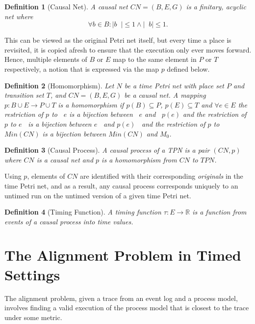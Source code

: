 \documentclass[conference]{IEEEtran}
\DeclareMathOperator*{\pre}{^\bullet}
\newtheorem{definition}{Definition}
\begin{document}
	\begin{definition}[Causal Net] \label{cn}
		A \textit{causal net} $CN = (B, E, G)$ is a finitary, acyclic net where 
		$$\forall b \in B : |b \pre| \leq 1 \wedge | \pre b| \leq 1.$$
	\end{definition}
	
	This can be viewed as the original Petri net itself, but every time a place is revisited, it is copied afresh to ensure that the execution only ever moves forward. 
	Hence, multiple elements of $B$ or $E$ map to the same element in $P$ or $T$ respectively, a notion that is expressed via the map $p$ defined below. 
	
	\begin{definition}[Homomorphism] \label{hom}  Let $N$ be a time Petri net with place set $P$ and transition set $T$, and ${CN = (B, E, G)}$ be a causal net. 
		A mapping $p : B \cup E \rightarrow P \cup T$ is a \textit{homomorphism} if $p(B) \subseteq P$,  $p(E) \subseteq T$ and $\forall e \in E$ the restriction of $p$ to $\pre e$ is a bijection between $\pre e$ and $\pre p(e)$ and the restriction of $p$ to $e \pre $ is a bijection between $e \pre $ and $p(e) \pre $ and the restriction of $p$ to $Min(CN)$ is a bijection between $Min(CN)$ and $M_0$. 
	\end{definition}
	
	\begin{definition}[Causal Process]\label{cp} A \textit{causal process} of a TPN is a pair $(CN, p)$ where $CN$ is a causal net and $p$ is a homomorphism from $CN$ to $TPN$. 
	\end{definition}
	
	Using $p$, elements of $CN$ are identified with their corresponding \emph{originals} in the time Petri net, and as a result, any causal process corresponds uniquely to an untimed run on the untimed version of a given time Petri net. 
	
	\begin{definition}[Timing Function]\label{tau} A \textit{timing function} $\tau : E \rightarrow \mathbb{R}$ is a function from events of a causal process into time values. 
	\end{definition}
	
	\section{The Alignment Problem in Timed Settings}
	The alignment problem, given a trace from an event log and a process model, involves finding a valid execution of the process model that is closest to the trace under some metric.
	
\end{document}
